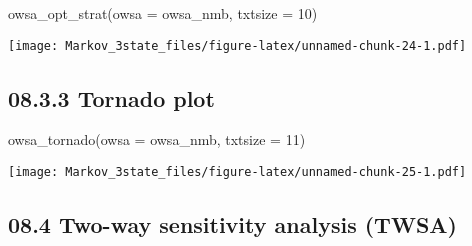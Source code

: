 \documentclass[
]{article}
\newenvironment{Shaded}{\begin{snugshade}}{\end{snugshade}}
\newcommand{\AttributeTok}[1]{\textcolor[rgb]{0.77,0.63,0.00}{#1}}
\newcommand{\DecValTok}[1]{\textcolor[rgb]{0.00,0.00,0.81}{#1}}
\newcommand{\FunctionTok}[1]{\textcolor[rgb]{0.00,0.00,0.00}{#1}}
\newcommand{\NormalTok}[1]{#1}
\begin{document}
\begin{Shaded}
\begin{Highlighting}[]
\FunctionTok{owsa\_opt\_strat}\NormalTok{(}\AttributeTok{owsa =}\NormalTok{ owsa\_nmb, }\AttributeTok{txtsize =} \DecValTok{10}\NormalTok{)}
\end{Highlighting}
\end{Shaded}

\texttt{[image: Markov\_3state\_files/figure-latex/unnamed-chunk-24-1.pdf]}

\hypertarget{tornado-plot}{%
\subsection{08.3.3 Tornado plot}\label{tornado-plot}}

\begin{Shaded}
\begin{Highlighting}[]
\FunctionTok{owsa\_tornado}\NormalTok{(}\AttributeTok{owsa =}\NormalTok{ owsa\_nmb, }\AttributeTok{txtsize =} \DecValTok{11}\NormalTok{)}
\end{Highlighting}
\end{Shaded}

\texttt{[image: Markov\_3state\_files/figure-latex/unnamed-chunk-25-1.pdf]}

\hypertarget{two-way-sensitivity-analysis-twsa}{%
\subsection{08.4 Two-way sensitivity analysis
(TWSA)}\label{two-way-sensitivity-analysis-twsa}}
\end{document}
